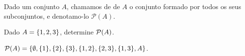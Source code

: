 \begin{definition}
Dado um conjunto $A$, chamamos de  de $A$ o conjunto formado por todos os seus subconjuntos, e denotamo-lo $\mathcal{P}(A)$.
\end{definition}

\begin{example}
Dado $A = \left\{1,2,3\right\}$, determine $\mathcal{P}(A)$.
\end{example}

\begin{solution}
$\mathcal{P}(A)=\{\emptyset,\{1\}, \{2\}, \{3\}, \{1,2\}, \{2,3\}, \{1,3\},A\}$.
\end{solution}
